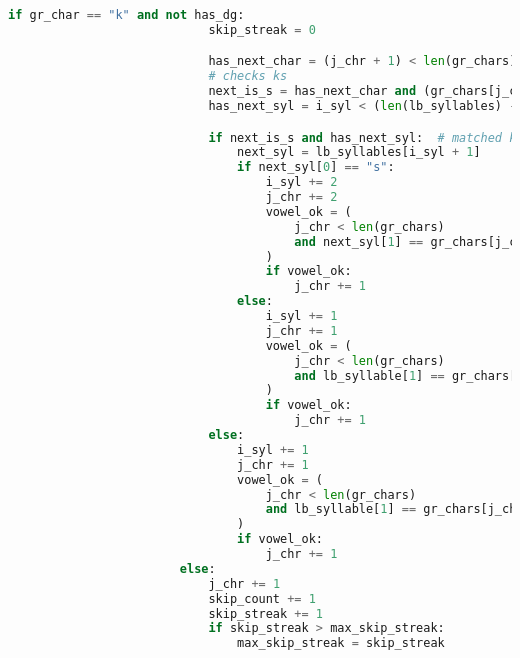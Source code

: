 \begin{lstlisting}[language=Python, caption=Brute-Force matching algorithm, breaklines=true, postbreak=\mbox{\hspace{50pt}\textcolor{red}{$\hookrightarrow$}\space}]
                        if gr_char == "k" and not has_dg:
                            skip_streak = 0

                            has_next_char = (j_chr + 1) < len(gr_chars)
                            # checks ks
                            next_is_s = has_next_char and (gr_chars[j_chr + 1] == "s")
                            has_next_syl = i_syl < (len(lb_syllables) - 1)

                            if next_is_s and has_next_syl:  # matched ks
                                next_syl = lb_syllables[i_syl + 1]
                                if next_syl[0] == "s":
                                    i_syl += 2
                                    j_chr += 2
                                    vowel_ok = (
                                        j_chr < len(gr_chars)
                                        and next_syl[1] == gr_chars[j_chr]
                                    )
                                    if vowel_ok:
                                        j_chr += 1
                                else:
                                    i_syl += 1
                                    j_chr += 1
                                    vowel_ok = (
                                        j_chr < len(gr_chars)
                                        and lb_syllable[1] == gr_chars[j_chr]
                                    )
                                    if vowel_ok:
                                        j_chr += 1
                            else:
                                i_syl += 1
                                j_chr += 1
                                vowel_ok = (
                                    j_chr < len(gr_chars)
                                    and lb_syllable[1] == gr_chars[j_chr]
                                )
                                if vowel_ok:
                                    j_chr += 1
                        else:
                            j_chr += 1
                            skip_count += 1
                            skip_streak += 1
                            if skip_streak > max_skip_streak:
                                max_skip_streak = skip_streak


\end{lstlisting}
